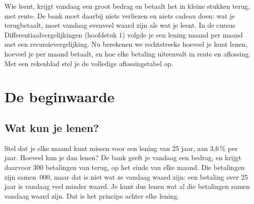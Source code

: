 Wie leent, krijgt vandaag een groot bedrag en betaalt het in kleine stukken terug, met rente. De bank moet daarbij niets verliezen en niets cadeau doen: wat je terugbetaalt, moet vandaag evenveel waard zijn als wat je leent. In de cursus Differentiaalvergelijkingen (hoofdstuk 1) volgde je een lening maand per maand met een recursievergelijking. Nu berekenen we rechtstreeks hoeveel je kunt lenen, hoeveel je per maand betaalt, en hoe elke betaling uiteenvalt in rente en aflossing. Met een rekenblad stel je de volledige aflossingstabel op.

\begin{oefeningen}[Start]

\end{oefeningen}


\section{De beginwaarde}

\subsection{Wat kun je lenen?}

Stel dat je elke maand  kunt missen voor een lening van 25 jaar, aan 3,6\,\% per jaar. Hoeveel kun je dan lenen? De bank geeft je vandaag een bedrag, en krijgt daarvoor 300 betalingen van  terug, op het einde van elke maand. Die betalingen zijn samen \,000, maar dat is niet wat ze vandaag waard zijn: een betaling over 25 jaar is vandaag veel minder waard. Je kunt dus lenen wat al die betalingen samen vandaag waard zijn. Dat is het principe achter elke lening.

